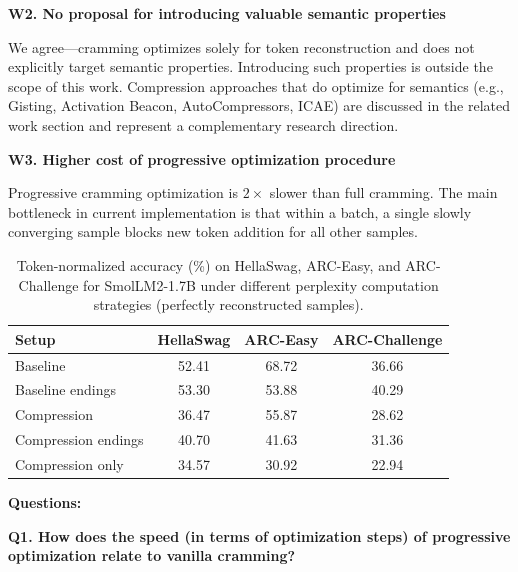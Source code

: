 \textbf{W2. No proposal for introducing valuable semantic properties}

We agree---cramming optimizes solely for token reconstruction and does not explicitly
target semantic properties. Introducing such properties is outside the scope of this
work. Compression approaches that do optimize for semantics (e.g., Gisting, Activation
Beacon, AutoCompressors, ICAE) are discussed in the related work section and represent
a complementary research direction.

\textbf{W3. Higher cost of progressive optimization procedure}

Progressive cramming optimization is $2\times$ slower than full cramming. The main
bottleneck in current implementation is that within a batch, a single slowly converging sample blocks new token addition for all other samples.

\setcounter{table}{9}
\begin{table}[t]
\centering
\caption{Token-normalized accuracy (\%) on HellaSwag, ARC-Easy, and ARC-Challenge for SmolLM2-1.7B under different perplexity computation strategies (perfectly reconstructed samples).}
\label{tab:semantic_benchmarks_token}


\begin{tabular}{lccc}
\hline
\textbf{Setup} & \textbf{HellaSwag} & \textbf{ARC-Easy} & \textbf{ARC-Challenge} \\
\hline
Baseline & 52.41 & 68.72 & 36.66 \\
Baseline endings & 53.30 & 53.88 & 40.29 \\
Compression & 36.47 & 55.87 & 28.62 \\
Compression endings & 40.70 & 41.63 & 31.36 \\
Compression only & 34.57 & 30.92 & 22.94 \\
\hline
\end{tabular}

\end{table}

\textbf{Questions:}

\textbf{Q1. How does the speed (in terms of optimization steps) of progressive optimization relate to vanilla cramming?}

